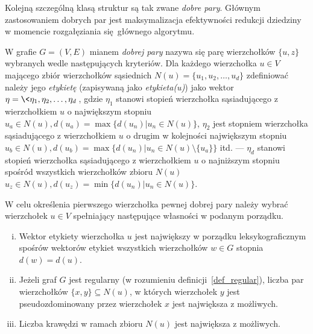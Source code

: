 \par{
  Kolejną szczególną klasą struktur są tak zwane \emph{dobre pary}.
  Głównym zastosowaniem dobrych par jest maksymalizacja efektywności redukcji dziedziny w momencie rozgałęziania się głównego algorytmu.
  \begin{definition}
    W grafie $G=(V, E)$ mianem \emph{dobrej pary} nazywa się parę wierzchołków $\{u, z\}$ wybranych wedle następujących kryteriów.
    Dla każdego wierzchołka $u \in V$ mającego zbiór wierzchołków sąsiednich $N(u)=\{u_1, u_2, \ldots, u_d\}$ zdefiniować należy jego \emph{etykietę} (zapisywaną jako \emph{etykieta(u)}) jako wektor $\eta=\<\eta_1, \eta_2, \ldots, \eta_d\>$, gdzie $\eta_1$ stanowi stopień wierzchołka sąsiadującego z wierzchołkiem $u$ o największym stopniu $u_{a} \in N(u), d(u_{a})=\max\{d(u_n) | u_n \in N(u)\}$, $\eta_2$ jest stopniem wierzchołka sąsiadującego z wierzchołkiem $u$ o drugim w kolejności największym stopniu $u_{b} \in N(u), d(u_{b})=\max\{d(u_n) | u_n \in N(u) \setminus \{u_{a}\}\}$ itd. --- $\eta_d$ stanowi stopień wierzchołka sąsiadującego z wierzchołkiem $u$ o najniższym stopniu spośród wszystkich wierzchołków zbioru $N(u)$ $u_{z} \in N(u), d(u_{z})=\min\{d(u_n) | u_n \in N(u)\}$.

    W celu określenia pierwszego wierzchołka pewnej dobrej pary należy wybrać wierzchołek $u \in V$ spełniający następujące własności w podanym porządku.
    \begin{enumerate}[(i)]
      \item Wektor etykiety wierzchołka $u$ jest największy w porządku leksykograficznym spośrów wektorów etykiet wszystkich wierzchołków $w \in G$ stopnia $d(w)=d(u)$.
      \item  Jeżeli graf $G$ jest regularny (w rozumieniu definicji~\ref{def_regular}), liczba par wierzchołków $\{x, y\} \subseteq N(u)$, w których wierzchołek $y$ jest pseudozdominowany przez wierzchołek $x$ jest największa z możliwych.
      \item Liczba krawędzi w ramach zbioru $N(u)$ jest największa z możliwych.
    \end{enumerate}


\end{definition}}
